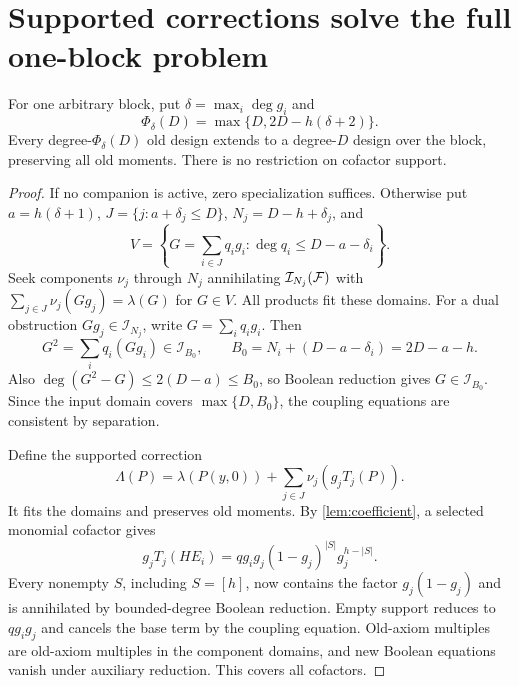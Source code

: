 \section{Supported corrections solve the full one-block problem}
\begin{theorem}\label{thm:supported}
For one arbitrary block, put $\delta=\max_i\deg g_i$ and
\[
 \Phi_\delta(D)=\max\{D,2D-h(\delta+2)\}.
\]
Every degree-$\Phi_\delta(D)$ old design extends to a degree-$D$ design over the block, preserving all old moments. There is no restriction on cofactor support.
\end{theorem}
\begin{proof}
If no companion is active, zero specialization suffices. Otherwise put $a=h(\delta+1)$, $J=\{j:a+\delta_j\le D\}$, $N_j=D-h+\delta_j$, and
\[
 V=\left\{G=\sum_{i\in J}q_ig_i:\deg q_i\le D-a-\delta_i\right\}.
\]
Seek components $\nu_j$ through $N_j$ annihilating $\mathcal I_{N_j}(\mathcal F)$ with
$\sum_{j\in J}\nu_j(Gg_j)=\lambda(G)$ for $G\in V$.
All products fit these domains. For a dual obstruction $Gg_j\in\mathcal I_{N_j}$, write $G=\sum_iq_ig_i$. Then
\[
 G^2=\sum_iq_i(Gg_i)\in\mathcal I_{B_0},\qquad
 B_0=N_i+(D-a-\delta_i)=2D-a-h.
\]
Also $\deg(G^2-G)\le2(D-a)\le B_0$, so Boolean reduction gives $G\in\mathcal I_{B_0}$. Since the input domain covers $\max\{D,B_0\}$, the coupling equations are consistent by separation.

Define the supported correction
\[
 \boxed{\Lambda(P)=\lambda(P(y,0))+\sum_{j\in J}\nu_j(g_jT_j(P)).}
\]
It fits the domains and preserves old moments. By \cref{lem:coefficient}, a selected monomial cofactor gives
\[
 g_jT_j(HE_i)=qg_i g_j(1-g_j)^{|S|}g_j^{h-|S|}.
\]
Every nonempty $S$, including $S=[h]$, now contains the factor $g_j(1-g_j)$ and is annihilated by bounded-degree Boolean reduction. Empty support reduces to $qg_ig_j$ and cancels the base term by the coupling equation. Old-axiom multiples are old-axiom multiples in the component domains, and new Boolean equations vanish under auxiliary reduction. This covers all cofactors.
\end{proof}

